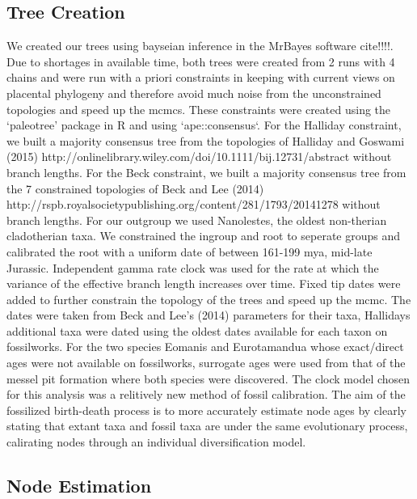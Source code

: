 \documentclass[11pt,letterpaper]{article}
\begin{document}
\newpage

\subsection{Tree Creation}

We created our trees using bayseian inference in the MrBayes software cite!!!!. Due to shortages in available time, both trees were created from 2 runs with 4 chains and were run with a priori constraints in keeping with current views on placental phylogeny and therefore avoid much noise from the unconstrained topologies and speed up the mcmcs. These constraints were created using the `paleotree' package in R and using `ape::consensus`. For the Halliday constraint, we built a majority consensus tree from the topologies of Halliday and Goswami (2015) http://onlinelibrary.wiley.com/doi/10.1111/bij.12731/abstract without branch lengths. For the Beck constraint, we built a majority consensus tree from the 7 constrained topologies of Beck and Lee (2014) http://rspb.royalsocietypublishing.org/content/281/1793/20141278 without branch lengths. For our outgroup we used Nanolestes, the oldest non-therian cladotherian taxa. We constrained the ingroup and root to seperate groups and calibrated the root with a uniform date of between 161-199 mya, mid-late Jurassic. Independent gamma rate clock was used for the rate at which the variance of the effective branch length increases over time. Fixed tip dates were added to further constrain the topology of the trees and speed up the mcmc. The dates were taken from Beck and Lee's (2014) parameters for their taxa, Hallidays additional taxa were dated using the oldest dates available for each taxon on fossilworks. For the two species Eomanis and Eurotamandua whose exact/direct ages were not available on fossilworks, surrogate ages were used from that of the messel pit formation where both species were discovered. The clock model chosen for this analysis was a relitively new method of fossil calibration. The aim of the fossilized birth-death process is to more accurately estimate node ages by clearly stating that extant taxa and fossil taxa are under the same evolutionary process, calirating nodes through an individual diversification model.

\newpage

\subsection{Node Estimation}
\end{document}
